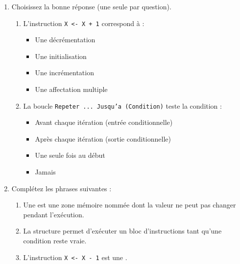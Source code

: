 \documentclass[11pt]{article}
\begin{document}
\begin{exercice}
\begin{enumerate}
    \item Choisissez la bonne réponse (une seule par question).
    \begin{enumerate}
        \item L'instruction \texttt{X <- X + 1} correspond à :
        \begin{itemize}
            \item[a)] Une décrémentation
            \item[b)] Une initialisation
            \item[c)] Une incrémentation
            \item[d)] Une affectation multiple
        \end{itemize}
        \item La boucle \texttt{Repeter ... Jusqu'a (Condition)} teste la condition :
        \begin{itemize}
            \item[a)] Avant chaque itération (entrée conditionnelle)
            \item[b)] Après chaque itération (sortie conditionnelle)
            \item[c)] Une seule fois au début
            \item[d)] Jamais
        \end{itemize}
    \end{enumerate}
    \item Complétez les phrases suivantes :
    \begin{enumerate}
        \item Une \underline{\hspace{5cm}} est une zone mémoire nommée dont la valeur ne peut pas changer pendant l'exécution.
        \item La structure \underline{\hspace{5cm}} permet d'exécuter un bloc d'instructions tant qu'une condition reste vraie.
        \item L'instruction \texttt{X <- X - 1} est une \underline{\hspace{5cm}}.
    \end{enumerate}
\end{enumerate}
\end{exercice}
\end{document}
